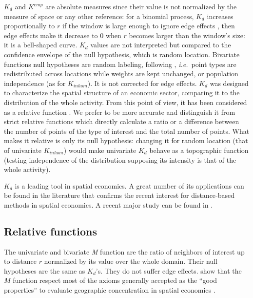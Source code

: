 \documentclass[nojss]{jss}
\begin{document}
$K_d$ and $K^{emp}$ are absolute measures since their value is not normalized by the measure of space or any other reference: for a binomial process, $K_d$ increases proportionally to $r$ if the window is large enough to ignore edge effects \citep[the probability density is proportional to the perimeter of the circle of radius $r$,][]{Thomas2013}, then edge effects make it decrease to 0 when $r$ becomes larger than the window's size: it is a bell-shaped curve.
$K_d$ values are not interpreted but compared to the confidence envelope of the null hypothesis, which is random location.
Bivariate functions null hypotheses are random labeling, following \cite{Duranton2005}, \emph{i.e.}\ point types are redistributed across locations while weights are kept unchanged, or population independence (as for $K_{inhom}$).
It is not corrected for edge effects.
$K_d$ was designed to characterize the spatial structure of an economic sector, comparing it to the distribution of the whole activity.
From this point of view, it has been considered as a relative function \cite{Marcon2010}. 
We prefer to be more accurate and distinguish it from strict relative functions which directly calculate a ratio or a difference between the number of points of the type of interest and the total number of points.
What makes it relative is only its null hypothesis: changing it for random location (that of univariate $K_{inhom}$) would make univariate $K_d$ behave as a topographic function (testing independence of the distribution supposing its intensity is that of the whole activity).

$K_d$ is a leading tool in spatial economics. A great number of its applications can be found in the literature that confirms the recent interest for distance-based methods in spatial economics. A recent major study can be found in \cite{Ellison2010}.


\subsection{Relative functions}\label{Relative}

The univariate and bivariate \emph{M} function \citep{Marcon2010} are the ratio of neighbors of interest up to distance $r$ normalized by its value over the whole domain. Their null hypotheses are the same as $K_d$'s. They do not suffer edge effects. \cite{Marcon2010} show that the $M$ function respect most of the axioms generally accepted as the ``good properties'' to evaluate geographic concentration in spatial economics \citep{Combes2004, Duranton2005}.
\end{document}
